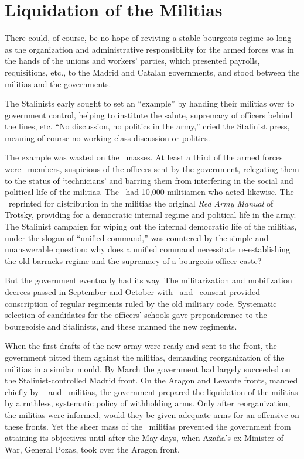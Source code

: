 \section*{Liquidation of the Militias}

There could, of course, be no hope of reviving a stable bourgeois regime so long as the organization and administrative responsibility for the armed forces was in the hands of the unions and workers’ parties, which presented payrolls, requisitions, etc., to the Madrid and Catalan governments, and stood between the militias and the governments.

The Stalinists early sought to set an ``example'' by handing their militias over to government control, helping to institute the salute, supremacy of officers behind the lines, etc. ``No discussion, no politics in the army,'' cried the Stalinist press, meaning of course no working-class discussion or politics.

The example was wasted on the \CNT\ masses. At least a third of the armed forces were \CNT\ members, suspicious of the officers sent by the government, relegating them to the status of ‘technicians’ and barring them from interfering in the social and political life of the militias. The \POUM\ had 10,000 militiamen who acted likewise. The \POUM\ reprinted for distribution in the militias the original \emph{Red Army Manual} of Trotsky, providing for a democratic internal regime and political life in the army. The Stalinist campaign for wiping out the internal democratic life of the militias, under the slogan of ``unified command,'' was countered by the simple and unanswerable question: why does a unified command necessitate re-establishing the old barracks regime and the supremacy of a bourgeois officer caste?

But the government eventually had its way. The militarization and mobilization decrees passed in September and October with \CNT\ and \POUM\ consent provided conscription of regular regiments ruled by the old military code. Systematic selection of candidates for the officers’ schools gave preponderance to the bourgeoisie and Stalinists, and these manned the new regiments.

When the first drafts of the new army were ready and sent to the front, the government pitted them against the militias, demanding reorganization of the militias in a similar mould. By March the government had largely succeeded on the Stalinist-controlled Madrid front. On the Aragon and Levante fronts, manned chiefly by \CNT-\FAI\ and \POUM\ militias, the government prepared the liquidation of the militias by a ruthless, systematic policy of withholding arms. Only after reorganization, the militias were informed, would they be given adequate arms for an offensive on these fronts. Yet the sheer mass of the \CNT\ militias prevented the government from attaining its objectives until after the May days, when Azaña’s ex-Minister of War, General Pozas, took over the Aragon front.

